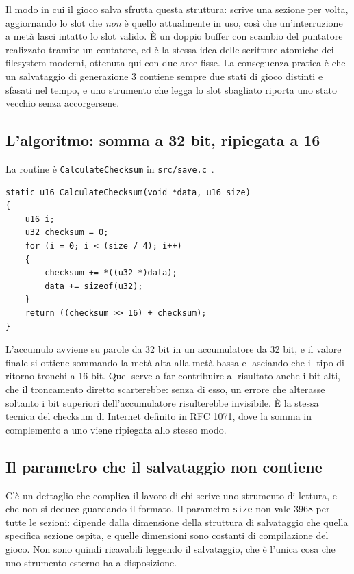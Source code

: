 Il modo in cui il gioco salva sfrutta questa struttura: scrive una sezione per volta,
aggiornando lo slot che \emph{non} è quello attualmente in uso, così che un'interruzione a
metà lasci intatto lo slot valido. È un doppio buffer con scambio del puntatore realizzato
tramite un contatore, ed è la stessa idea delle scritture atomiche dei filesystem moderni,
ottenuta qui con due aree fisse. La conseguenza pratica è che un salvataggio di generazione
3 contiene sempre due stati di gioco distinti e sfasati nel tempo, e uno strumento che
legga lo slot sbagliato riporta uno stato vecchio senza accorgersene.

\subsection{L'algoritmo: somma a 32 bit, ripiegata a 16}

La routine è \texttt{CalculateChecksum} in \texttt{src/save.c}~\cite{pokeemerald}.

\begin{lstlisting}[style=c,caption={Il checksum di sezione: accumulo a 32 bit su parole da 32 bit, poi ripiegamento.}]
static u16 CalculateChecksum(void *data, u16 size)
{
    u16 i;
    u32 checksum = 0;
    for (i = 0; i < (size / 4); i++)
    {
        checksum += *((u32 *)data);
        data += sizeof(u32);
    }
    return ((checksum >> 16) + checksum);
}
\end{lstlisting}

L'accumulo avviene su parole da 32 bit in un accumulatore da 32 bit, e il valore finale si
ottiene sommando la metà alta alla metà bassa e lasciando che il tipo di ritorno tronchi a
16 bit. Quel  serve a far contribuire al risultato anche i bit alti, che
il troncamento diretto scarterebbe: senza di esso, un errore che alterasse soltanto i bit
superiori dell'accumulatore risulterebbe invisibile. È la stessa tecnica del checksum di
Internet definito in RFC 1071, dove la somma in complemento a uno viene ripiegata allo
stesso modo.

\subsection{Il parametro che il salvataggio non contiene}

C'è un dettaglio che complica il lavoro di chi scrive uno strumento di lettura, e che non
si deduce guardando il formato. Il parametro \texttt{size} non vale 3968 per tutte le
sezioni: dipende dalla dimensione della struttura di salvataggio che quella specifica
sezione ospita, e quelle dimensioni sono costanti di compilazione del gioco. Non sono
quindi ricavabili leggendo il salvataggio, che è l'unica cosa che uno strumento esterno ha
a disposizione.

